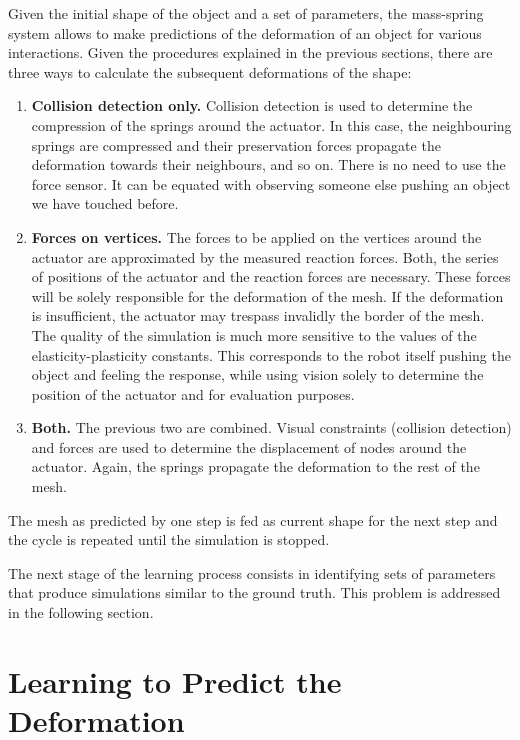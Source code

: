 \documentclass[journal]{IEEEtran}
\begin{document}
Given the initial shape of the object and a set of parameters, the mass-spring system allows to make predictions of the deformation of an object for various interactions.  Given the procedures explained in the previous sections, there are three ways to calculate the subsequent deformations of the shape:
\begin{enumerate}
 \item \textbf{Collision detection only.} Collision detection is used to determine the compression of the springs around the actuator.  In this case, the neighbouring springs are compressed and their preservation forces propagate the deformation towards their neighbours, and so on.  There is no need to use the force sensor.  It can be equated with observing someone else pushing an object we have touched before.
 \item \textbf{Forces on vertices.} The forces to be applied on the  vertices around the actuator are approximated by the measured reaction forces.  Both, the series of positions of the actuator and the reaction forces are necessary.  These forces will be solely responsible for the deformation of the mesh.  If the deformation is insufficient, the actuator may trespass invalidly the border of the mesh.  The quality of the simulation is much more sensitive to the values of the elasticity-plasticity constants.  This corresponds to the robot itself pushing the object and feeling the response, while using vision solely to determine the position of the actuator and for evaluation purposes.
 \item \textbf{Both.} The previous two are combined.  Visual constraints (collision detection) and forces are used to determine the displacement of nodes around the actuator.  Again, the springs propagate the deformation to the rest of the mesh.
\end{enumerate}
The mesh as predicted by one step is fed as current shape for the next step and the cycle is repeated until the simulation is stopped.

The next stage of the learning process consists in identifying sets of parameters that produce simulations similar to the ground truth.  This problem is addressed in the following section.



\section{Learning to Predict the Deformation}
\label{sec:learning}
\end{document}
